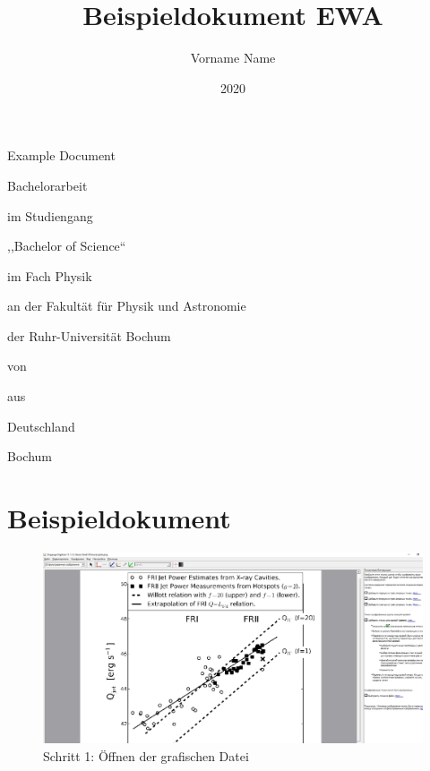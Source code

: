 \documentclass[11pt,
               a4paper,
               parskip=half, style=authoryear, citestyle=authoryear-comp
              bibliography=totoc,
               ]{scrartcl}
\title{Beispieldokument EWA} %
\author{Vorname Name} %
\date{2020} %
\newcommand{\theothertitle}{Example Document} %
\newcommand{\bachelormaster}{Bachelor} %
\newcommand{\sciencearts}{Science} %
\newcommand{\placeofbirth}{Deutschland} %
\newcommand{\location}{Bochum}
\begin{document}
\begin{titlepage}
  \centering
  {\huge\titlefont\thetitle\par
                  \bigskip\bigskip
                  \theothertitle\par}
  \vspace{2cm}

  \begin{spacing}{0.8}
    {\LARGE \bachelormaster arbeit\par
            \bigskip\medskip
            im Studiengang\par
            ,,\bachelormaster{} of \sciencearts``\par
            im Fach Physik\par
            \bigskip\medskip
            an der Fakultät für Physik und Astronomie\par
            der Ruhr-Universität Bochum\par}

    \vfill

    {\LARGE von\par
            \theauthor\par
            \bigskip\medskip
            aus\par
            \placeofbirth\par}
  \end{spacing}

  \vspace{1.8cm}

  {\LARGE \location{} \thedate\par}
\end{titlepage}
\restoregeometry
\cleardoublepage

\tableofcontents
\cleardoublepage

\section{Beispieldokument}

\begin{figure}
    \centering
    \includegraphics[scale=0.35]{shag1.jpg}
    \caption{Schritt 1: Öffnen der grafischen Datei}
    \label{fig:my_label}
\end{figure}
\end{document}
